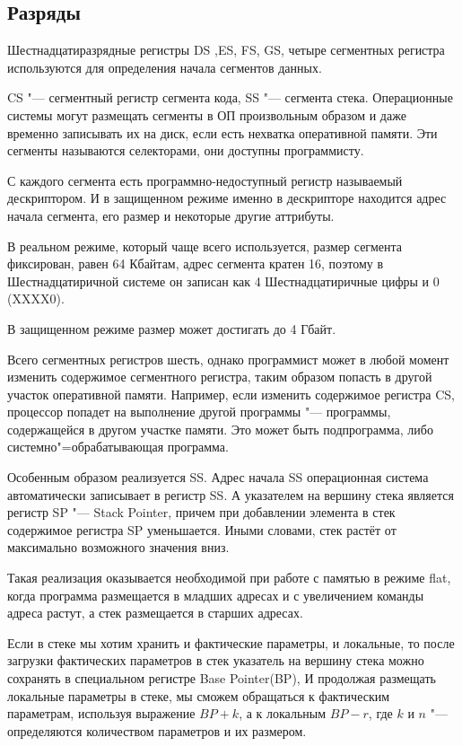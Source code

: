 \subsection{Разряды}

Шестнадцатиразрядные регистры DS ,ES, FS, GS, четыре сегментных регистра используются для определения начала сегментов данных.

CS "--- сегментный регистр сегмента кода, SS "--- сегмента стека.
Операционные системы могут размещать сегменты в ОП произвольным образом и даже временно записывать их на диск, если есть
нехватка оперативной памяти. Эти сегменты называются селекторами, они доступны программисту. 

С каждого сегмента есть программно-недоступный регистр называемый дескриптором. И в защищенном режиме именно в дескрипторе находится адрес
начала сегмента, его размер и некоторые другие аттрибуты. 

В реальном режиме, который чаще всего используется, размер
сегмента фиксирован, равен 64 Кбайтам, адрес сегмента кратен 16, поэтому в Шестнадцатиричной системе он записан
как 4 Шестнадцатиричные цифры и 0 (XXXX0).

В защищенном режиме размер может достигать до 4 Гбайт.

Всего сегментных регистров шесть, однако программист может в любой момент изменить содержимое сегментного регистра, таким
образом попасть в другой участок оперативной памяти. Например, если изменить содержимое регистра CS, процессор попадет
на выполнение другой программы "--- программы, содержащейся в другом участке памяти. Это может быть подпрограмма, либо
системно"=обрабатывающая программа.

Особенным образом реализуется SS. Адрес начала SS операционная система автоматически записывает в регистр SS. А указателем
на вершину стека является регистр SP "--- Stack Pointer, причем при добавлении элемента в стек содержимое регистра SP уменьшается.
Иными словами, стек растёт от максимально возможного значения вниз.

Такая реализация оказывается необходимой при работе с памятью в режиме flat, когда программа размещается в младших адресах
и с увеличением команды адреса растут, а стек размещается в старших адресах.

Если в стеке мы хотим хранить и фактические параметры, и локальные, то после загрузки фактических параметров в стек
указатель на вершину стека можно сохранять в специальном регистре Base Pointer(BP), И продолжая размещать локальные
параметры в стеке, мы сможем обращаться к фактическим параметрам, используя выражение $BP + k$, а к локальным $BP - r$,
где $k$ и $n$ "--- определяются количеством параметров и их размером.

